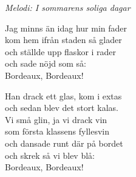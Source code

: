 {\footnotesize\textit{Melodi: I sommarens soliga dagar}}\par
\vspace{10pt}
Jag minns än idag hur min fader\\
kom hem ifrån staden så glader\\
och ställde upp flaskor i rader\\
och sade nöjd som så:\\
Bordeaux, Bordeaux!\par
\vspace{10pt}
Han drack ett glas, kom i extas\\
och sedan blev det stort kalas.\\
Vi små glin, ja vi drack vin\\
som första klassens fyllesvin\\
och dansade runt där på bordet\\
och skrek så vi blev blå:\\
Bordeaux, Bordeaux!
